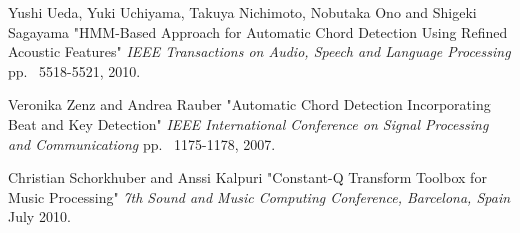 \documentclass{article}
\begin{document}
\begin{thebibliography}{citations}
Yushi Ueda, Yuki Uchiyama, Takuya Nichimoto, Nobutaka Ono and Shigeki Sagayama
"HMM-Based Approach for Automatic Chord Detection Using Refined Acoustic Features"
{\it IEEE Transactions on Audio, Speech and Language Processing}
pp. ~5518-5521, 2010.

Veronika Zenz and Andrea Rauber
"Automatic Chord Detection Incorporating Beat and Key Detection"
{\it IEEE International Conference on Signal Processing and Communicationg}
pp. ~1175-1178, 2007.

Christian Schorkhuber and Anssi Kalpuri
"Constant-Q Transform Toolbox for Music Processing"
{\it 7th Sound and Music Computing Conference, Barcelona, Spain}
July 2010.


\end{thebibliography}


\end{document}
